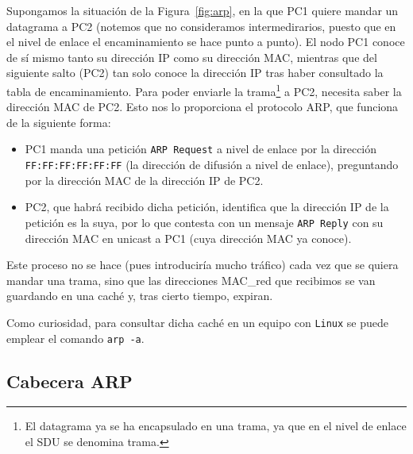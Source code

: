 Supongamos la situación de la Figura~\ref{fig:arp}, en la que PC1 quiere mandar un datagrama a PC2 (notemos que no consideramos intermedirarios, puesto que en el nivel de enlace el encaminamiento se hace punto a punto). El nodo PC1 conoce de sí mismo tanto su dirección IP como su dirección MAC\@, mientras que del siguiente salto (PC2) tan solo conoce la dirección IP tras haber consultado la tabla de encaminamiento. Para poder enviarle la trama\footnote{El datagrama ya se ha encapsulado en una trama, ya que en el nivel de enlace el \acrshort{SDU} se denomina trama.} a PC2, necesita saber la dirección MAC de PC2\@. Esto nos lo proporciona el protocolo \acrshort{ARP}, que funciona de la siguiente forma:
\begin{itemize}
    \item PC1 manda una petición \verb|ARP Request| a nivel de enlace por la dirección \verb|FF:FF:FF:FF:FF:FF| (la dirección de difusión a nivel de enlace), preguntando por la dirección MAC de la dirección IP de PC2.
    
    \item PC2, que habrá recibido dicha petición, identifica que la dirección IP de la petición es la suya, por lo que contesta con un mensaje \verb|ARP Reply| con su dirección MAC en unicast a PC1 (cuya dirección MAC ya conoce).
\end{itemize}

Este proceso no se hace (pues introduciría mucho tráfico) cada vez que se quiera mandar una trama, sino que las direcciones \acrshort{MAC_red} que recibimos se van guardando en una caché y, tras cierto tiempo, expiran.
\begin{observacion}
    Como curiosidad, para consultar dicha caché en un equipo con \verb|Linux| se puede emplear el comando \verb|arp -a|.
\end{observacion}

\subsection{Cabecera \acrshort{ARP}}

